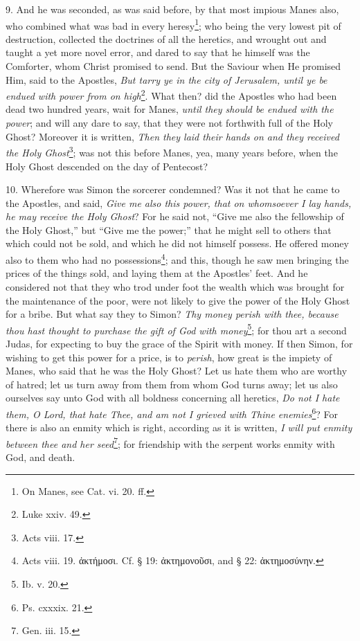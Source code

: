 9. And he was seconded, as was said before, by that most impious Manes also, who combined what was bad in every heresy\footnote{On Manes, see Cat. vi. 20. ff.}; who being the very lowest pit of destruction, collected the doctrines of all the heretics, and wrought out and taught a yet more novel error, and dared to say that he himself was the Comforter, whom Christ promised to send. But the Saviour when He promised Him, said to the Apostles, \emph{But tarry ye in the city of Jerusalem, until ye be endued with power from on high}\footnote{Luke xxiv. 49.}. What then? did the Apostles who had been dead two hundred years, wait for Manes, \emph{until they should be endued with the power}; and will any dare to say, that they were not forthwith full of the Holy Ghost? Moreover it is written, \emph{Then they laid their hands on and they received the Holy Ghost}\footnote{Acts viii. 17.}; was not this before Manes, yea, many years before, when the Holy Ghost descended on the day of Pentecost?

10. Wherefore was Simon the sorcerer condemned? Was it not that he came to the Apostles, and said, \emph{Give me also this power, that on whomsoever I lay hands, he may receive the Holy Ghost}? For he said not, “Give me also the fellowship of the Holy Ghost,” but “Give me the power;” that he might sell to others that which could not be sold, and which he did not himself possess. He offered money also to them who had no possessions\footnote{Acts viii. 19. \textgreek{ἀκτήμοσι}. Cf. § 19: \textgreek{ἀκτημονοῦσι}, and § 22: \textgreek{ἀκτημοσύνην}.}; and this, though he saw men bringing the prices of the things sold, and laying them at the Apostles’ feet. And he considered not that they who trod under foot the wealth which was brought for the maintenance of the poor, were not likely to give the power of the Holy Ghost for a bribe. But what say they to Simon? \emph{Thy money perish with thee, because thou hast thought to purchase the gift of God with money}\footnote{Ib. v. 20.}; for thou art a second Judas, for expecting to buy the grace of the Spirit with money. If then Simon, for wishing to get this power for a price, is to \emph{perish}, how great is the impiety of Manes, who said that he was the Holy Ghost? Let us hate them who are worthy of hatred; let us turn away from them from whom God turns away; let us also ourselves say unto God with all boldness concerning all heretics, \emph{Do not I hate them, O Lord, that hate Thee, and am not I grieved with Thine enemies}\footnote{Ps. cxxxix. 21.}? For there is also an enmity which is right, according as it is written, \emph{I will put enmity between thee and her seed}\footnote{Gen. iii. 15.}; for friendship with the serpent works enmity with God, and death.

